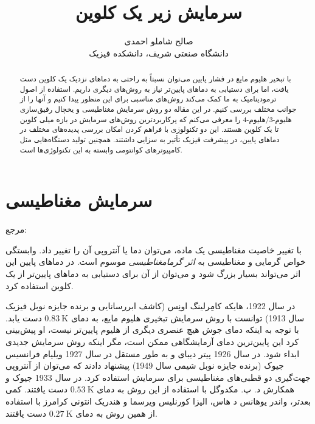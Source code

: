 \documentclass[12pt,a4paper]{article}
\title{سرمایش زیر یک کلوین}
\author{صالح شاملو احمدی\\دانشگاه صنعتی شریف، دانشکده فیزیک}
\begin{document}
	\maketitle
	\begin{abstract}
			با تبخیر هلیوم مایع در فشار پایین می‌توان نسبتاً به راحتی به دما‌های نزدیک یک کلوین دست یافت، اما برای دستیابی به دماهای پایین‌تر نیاز به روش‌های دیگری داریم.
			استفاده از اصول ترمودینامیک به ما کمک می‌کند روش‌های مناسبی برای این منظور پیدا کنیم و آنها را از جوانب مختلف بررسی کنیم.
			در این مقاله دو روش سرمایش مغناطیسی و یخچال رقیق‌سازی
			هلیوم-3/هلیوم-4 را معرفی می‌کنم
			که پرکاربردترین روش‌های سرمایش در بازه میلی کلوین تا یک کلوین هستند.
			این دو تکنولوژی با فراهم کردن امکان بررسی پدیده‌های مختلف در دما‌های پایین، در پیشرفت فیزیک تأثیر به سزایی داشتند.
			همچنین تولید دستگاه‌هایی مثل کامپیوتر‌های کوانتومی وابسته به این تکنولوژی‌ها است.
	\end{abstract}
	\section{سرمایش مغناطیسی}
	مرجع: \cite{adkins1983equilibrium}
	
	با تغییر خاصیت مغناطیسی یک ماده، می‌توان دما یا آنتروپی آن را تغییر داد.
	وابستگی خواص گرمایی و مغناطیسی به \emph{اثر گرمامغناطیسی} موسوم است.
	در دما‌های پایین این اثر می‌تواند بسیار بزرگ شود و می‌توان از آن برای دستیابی به دما‌های پایین‌تر از یک کلوین استفاده کرد.
	
	در سال 1922، هایکه کامِرلینگ اونِس (کاشف ابررسانایی و برنده جایزه نوبل فیزیک سال 1913)
	توانست با روش سرمایش تبخیری هلیوم مایع، به دمای $\SI{0.83}{\kelvin}$ دست یابد.
	با توجه به اینکه دمای جوش هیچ عنصری دیگری از هلیوم پایین‌تر نیست، او پیش‌بینی کرد این پایین‌ترین دمای آزمایشگاهی ممکن است، مگر اینکه روش سرمایش جدیدی ابداء شود.
	در سال 1926 پیتر دیبای و به طور مستقل در سال 1927 ویلیام فرانسیس جیوک
	(برنده جایزه نوبل شیمی سال 1949) پیشنهاد دادند که می‌توان از آنتروپی جهت‌گیری دو قطبی‌های مغناطیسی برای سرمایش استفاده کرد.
	در سال 1933 جیوک و همکارش د. پ. مکدوگل با استفاده از این روش به دمای $\SI{0.53}{\kelvin}$ دست یافتند. کمی بعدتر،
	واندر یوهانس د هاس، الیزا کورنلیس ویرسما
	و هندریک انتونی کرامرز  با استفاده از همین روش به دمای $\SI{0.27}{\kelvin}$ دست یافتند.
	
\end{document}
